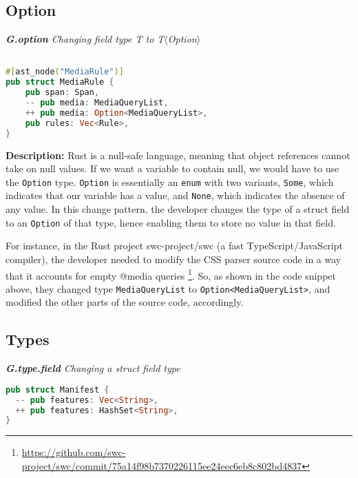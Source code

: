 \subsection{Option}
\vspace{3mm}

\noindent \textit{ \textbf{G.option} Changing field type T to T$\langle$Option$\rangle$}

\begin{lstlisting}[language=Rust, style=colouredRust]

#[ast_node("MediaRule")]
pub struct MediaRule {
    pub span: Span,
    -- pub media: MediaQueryList,
    ++ pub media: Option<MediaQueryList>,
    pub rules: Vec<Rule>,
}

\end{lstlisting}

\noindent \textbf{Description:} Rust is a null-safe language, meaning that object references cannot take on null values. If we want a variable to contain null, we would have to use the \texttt{Option} type. \texttt{Option} is essentially an \texttt{enum} with two variants, \texttt{Some}, which indicates that our variable has a value, and \texttt{None}, which indicates the absence of any value. In this change pattern, the developer changes the type of a struct field to an \texttt{Option} of that type, hence enabling them to store no value in that field.

For instance, in the Rust project swc-project/swc (a fast TypeScript/JavaScript compiler), the developer needed to modify the CSS parser source code in a way that it accounts for empty @media queries \footnote{\url{https://github.com/swc-project/swc/commit/75a14f98b7370226115ee24eec6eb8c802bd4837}}. So, as shown in the code snippet above, they changed type \texttt{MediaQueryList} to \verb+Option<MediaQueryList>+, and modified the other parts of the source code, accordingly.


\subsection{Types}
\vspace{3mm}

\noindent \textit{\label{sec:G.type.field}\textbf{G.type.field} Changing a struct field type}

\begin{lstlisting}[language=Rust, style=colouredRust]
pub struct Manifest {
  -- pub features: Vec<String>,
  ++ pub features: HashSet<String>,
}

\end{lstlisting}

